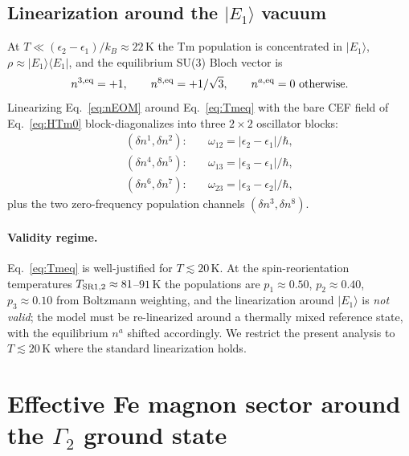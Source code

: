 \documentclass[reprint,amsmath,amssymb,aps,prb,longbibliography]{revtex4-2}
\begin{document}
\subsection{Linearization around the \texorpdfstring{$|E_1\rangle$}{|E1>} vacuum}
\label{sec:Tmlin}

At $T\ll(\epsilon_2-\epsilon_1)/k_B \approx 22$\,K the Tm population is
concentrated in $|E_1\rangle$, $\rho \approx |E_1\rangle\langle E_1|$,
and the equilibrium SU(3) Bloch vector is
\begin{equation}
n^{3,\rm eq} = +1,\qquad n^{8,\rm eq} = +1/\sqrt 3,\qquad
n^{a,\rm eq} = 0\text{ otherwise.}
\label{eq:Tmeq}
\end{equation}
Linearizing Eq.~\eqref{eq:nEOM} around Eq.~\eqref{eq:Tmeq} with the bare
CEF field of Eq.~\eqref{eq:HTm0} block-diagonalizes into three $2\times 2$
oscillator blocks:
\begin{equation}
\begin{aligned}
(\delta n^1, \delta n^2):&\quad \omega_{12} = |\epsilon_2-\epsilon_1|/\hbar,\\
(\delta n^4, \delta n^5):&\quad \omega_{13} = |\epsilon_3-\epsilon_1|/\hbar,\\
(\delta n^6, \delta n^7):&\quad \omega_{23} = |\epsilon_3-\epsilon_2|/\hbar,
\end{aligned}
\label{eq:omegabare}
\end{equation}
plus the two zero-frequency population channels $(\delta n^3, \delta n^8)$.

\paragraph*{Validity regime.} Eq.~\eqref{eq:Tmeq} is well-justified for
$T\lesssim 20$\,K. At the spin-reorientation temperatures
$T_{\rm SR1,2}\approx 81$--$91$\,K the populations are
$p_1\approx 0.50$, $p_2\approx 0.40$, $p_3\approx 0.10$ from
Boltzmann weighting, and the linearization around $|E_1\rangle$ is
\emph{not valid}; the model must be re-linearized around a thermally
mixed reference state, with the equilibrium $n^a$ shifted accordingly.
We restrict the present analysis to $T\lesssim 20$\,K where the standard
linearization holds.

\section{Effective Fe magnon sector around the \texorpdfstring{$\Gamma_2$}{Gamma2} ground state}
\label{sec:magnons}
\end{document}
